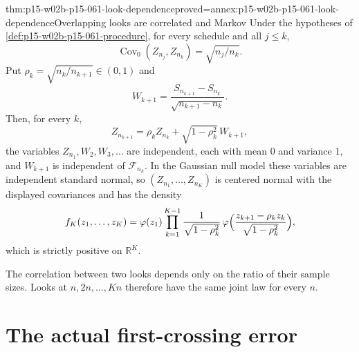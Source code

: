 \begin{hblemma}{thm:p15-w02b-p15-061-look-dependence}{proved=annex:p15-w02b-p15-061-look-dependence}{Overlapping looks are correlated and Markov}
Under the hypotheses of \cref{def:p15-w02b-p15-061-procedure}, for every
schedule and all \(j\leq k\),
\[
 \operatorname{Cov}_0(Z_{n_j},Z_{n_k})=\sqrt{n_j/n_k}.
\]
Put \(\rho_k=\sqrt{n_k/n_{k+1}}\in(0,1)\) and
\[
 W_{k+1}=\frac{S_{n_{k+1}}-S_{n_k}}{\sqrt{n_{k+1}-n_k}}.
\]
Then, for every \(k\),
\[
 Z_{n_{k+1}}=\rho_kZ_{n_k}+\sqrt{1-\rho_k^2}\,W_{k+1},
\]
the variables \(Z_{n_1},W_2,W_3,\ldots\) are independent, each with mean
\(0\) and variance \(1\), and \(W_{k+1}\) is independent of
\(\mathcal F_{n_k}\).
In the Gaussian null model these variables are independent standard
normal, so \((Z_{n_1},\ldots,Z_{n_K})\) is centered normal with the
displayed covariances and has the density
\[
 f_K(z_1,\ldots,z_K)=\varphi(z_1)\prod_{k=1}^{K-1}
 \frac1{\sqrt{1-\rho_k^2}}\,
 \varphi\Bigl(\frac{z_{k+1}-\rho_kz_k}{\sqrt{1-\rho_k^2}}\Bigr),
\]
which is strictly positive on \(\mathbb R^K\).
\end{hblemma}

The correlation between two looks depends only on the ratio of their sample
sizes. Looks at \(n,2n,\ldots,Kn\) therefore have the same joint law for
every \(n\).

\section{The actual first-crossing error}
\label{sec:p15-w02b-p15-061-error}

